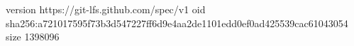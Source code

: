 version https://git-lfs.github.com/spec/v1
oid sha256:a721017595f73b3d547227ff6d9e4aa2de1101edd0ef0ad425539cac61043054
size 1398096
